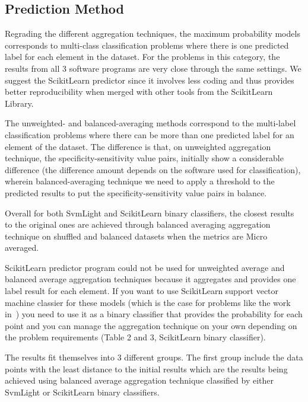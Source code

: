\subsection{Prediction Method}
Regrading the different aggregation techniques, the maximum probability models corresponds to multi-class classification 
problems where there is one predicted label for each element in the dataset. For the problems in this category, 
the results from all 3 software programs are very close through the same settings. We suggest the ScikitLearn predictor 
since it involves less coding and thus provides better reproducibility when merged with other tools from the ScikitLearn Library.

The unweighted- and balanced-averaging methods correspond to the multi-label classification problems where there can 
be more than one predicted label for an element of the dataset. The difference is that, on unweighted aggregation technique, 
the specificity-sensitivity value pairs, initially show a considerable difference (the difference amount depends on 
the software used for classification), wherein balanced-averaging technique we need to apply a threshold to
the predicted results to put the specificity-sensitivity value pairs in balance.

Overall for both SvmLight and ScikitLearn binary classifiers, the closest results to the original ones are achieved through 
balanced averaging aggregation technique on shuffled and balanced datasets when the metrics are Micro averaged.

ScikitLearn predictor program could not be used for unweighted average and balanced average aggregation techniques because 
it aggregates and provides one label result for each element. If you want to use ScikitLearn support vector machine 
classier for these models (which is the case for problems like the work in~\cite{mishra2014prediction}) 
you need to use it as a binary classifier that provides the probability for each point and you can manage the 
aggregation technique on your own depending on the problem requirements (Table 2 and 3, ScikitLearn binary classifier).

The results fit themselves into 3 different groups.
The first group include the data points with the least distance to the initial results which are the results being 
achieved using balanced average aggregation technique classified by either SvmLight or ScikitLearn binary classifiers. 

